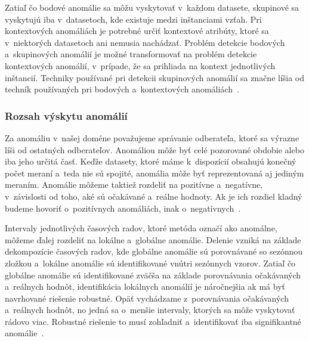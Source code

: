 \documentclass[a4paper,twoside,slovak,12pt,appendix]{article}
\begin{document}
\noindent
Zatiaľ čo bodové anomálie sa môžu vyskytovať v~každom datasete, skupinové sa
vyskytujú iba v~datasetoch, kde existuje medzi inštanciami vzťah. Pri
kontextových anomáliách je potrebné určiť kontextové atribúty, ktoré sa
v~niektorých datasetoch ani nemusia nachádzať. Problém detekcie bodových
a~skupinových anomálií je možné transformovať na problém detekcie kontextových
anomálií, v~prípade, že sa prihliada na kontext jednotlivých inštancií. Techniky
používané pri detekcii skupinových anomálií sa značne líšia od techník
používaných pri bodových a~kontextových anomáliách~\cite{Chandola2009}.


\subsubsection{Rozsah výskytu anomálií}
Za anomáliu v~našej doméne považujeme správanie odberateľa, ktoré sa výrazne
líši od ostatných odberateľov. Anomáliou môže byť celé pozorované obdobie alebo
iba jeho určitá časť. Keďže datasety, ktoré máme k~dispozícií obsahujú konečný
počet meraní a~teda nie sú spojité, anomália môže byť reprezentovaná aj jediným
meraním. Anomálie môžeme taktiež rozdeliť na pozitívne a~negatívne, v~závislosti
od toho, aké sú očakávané a~reálne hodnoty. Ak je ich rozdiel kladný budeme
hovoriť o~pozitívnych anomáliách, inak o~negatívnych~\cite{Kejariwal2015}.

Intervaly jednotlivých časových radov, ktoré metóda označí ako anomálne, môžeme
ďalej rozdeliť na lokálne a~globálne anomálie. Delenie vzniká na základe
dekompozície časových radov, kde globálne anomálie sú porovnávané so
sezónnou zložkou a~lokálne anomálie sú identifikované vnútri sezónnych vzorov.
Zatiaľ čo globálne anomálie sú identifikované zväčša na základe porovnávania
očakávaných a~reálnych hodnôt, identifikácia lokálnych anomálií je náročnejšia
ak má byť navrhované riešenie robustné. Opäť vychádzame z~porovnávania
očakávaných a~reálnych hodnôt, no jedná sa o~menšie intervaly, ktorých sa môže
vyskytovať rádovo viac. Robustné riešenie to musí zohľadniť a~identifikovať iba
signifikantné anomálie~\cite{Kejariwal2015}.

\end{document}
